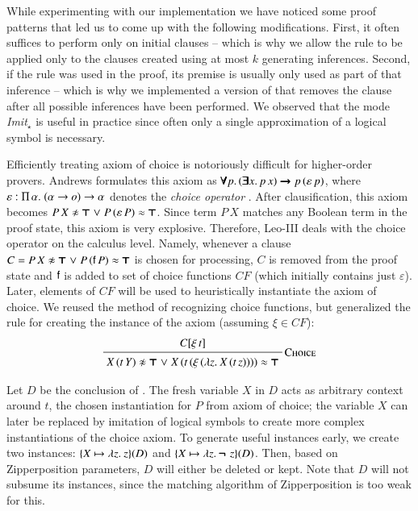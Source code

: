 While experimenting with our implementation we have noticed some proof patterns
that led us to come up with the following modifications. First, it often
suffices to perform  only on initial clauses -- which is why we
allow the rule to be applied only to the clauses created using at most $k$
generating inferences. Second, if the rule was used in the proof, its premise
is usually only used as part of that inference -- which is why we implemented
a version of  that removes the clause after all possible 
inferences have been performed. We observed that the mode \emph{Imit}$_\star$ is useful in practice since often only a single
approximation of a logical symbol is necessary.

Efficiently treating axiom of choice is notoriously difficult for higher-order provers. Andrews formulates
this axiom as $\pmb{\forall} p.\, (\pmb{\exists}
x.\, p \, x) \pmb{\rightarrow} p \, (\varepsilon \, p)$, where $\varepsilon :
\Pi\,\alpha.\;(\alpha \rightarrow o) \rightarrow \alpha$ denotes the \emph{choice
operator} \cite{pa-01-classical-ty-thy}. After clausification, this axiom becomes $P \, X \noteq \itrue \llor P
\, (\varepsilon \, P) \eq \itrue$. Since term $P \, X$ matches any Boolean
term in the proof state, this axiom is very explosive. Therefore, Leo-III
\cite{sb-21-leo3} deals with the choice operator on the calculus
level. Namely, whenever a clause $C = P \, X \noteq \itrue \llor P \, (\cst{f} \,
P) \eq \itrue$ is chosen for processing, $C$ is removed from the proof state and $\mathsf{f}$ is
added to set of choice functions $\mathit{CF}$ (which initially contains just
$\varepsilon$). Later, elements of $\mathit{CF}$ will be used to heuristically
instantiate the axiom of choice. We reused the method of recognizing choice
functions, but generalized the rule for creating the instance of
the axiom (assuming $\xi \in \mathit{CF}$):
%
$$\namedinference{Choice}
               {C[\xi \, t]}
               { X \, (t \, Y) \noteq \itrue \llor X \, (t \, (\xi \, (\lam{z}{X \, (t \, z)})) ) \eq \itrue }$$
%

Let $D$ be the conclusion of . The fresh variable $X$ in $D$ acts as
arbitrary context around $t$, the chosen instantiation for $P$ from axiom of choice;
the variable $X$ can later be replaced by imitation of logical symbols to create more
complex instantiations of the choice axiom. To generate useful instances early, we create two instances: $\{X
\mapsto \lambda z.\> z\}(D)$ and $\{X \mapsto \lambda z.\> \pmb{\neg\,}\, z\}(D)$. Then, based on
Zipperposition parameters, $D$ will either be deleted or kept. Note that $D$
will not subsume its instances, since the matching algorithm of Zipperposition is
too weak for this.

